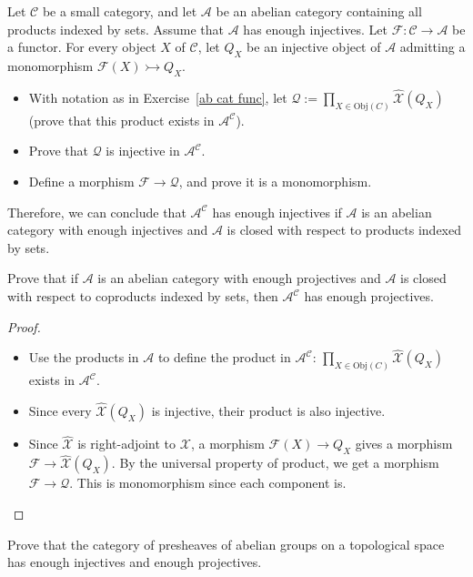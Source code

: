 \begin{exercise}
Let $\mathcal{C}$ be a small category, and let $\mathcal{A}$ be an abelian category containing all
products indexed by sets. Assume that $\mathcal{A}$ has enough injectives. Let $\mathscr{F}:\mathcal{C}\to\mathcal{A}$ be a functor. For every object $X$ of $\mathcal{C}$, let $Q_X$ be an injective object of $\mathcal{A}$ admitting a monomorphism $\mathscr{F}(X)\rightarrowtail Q_X$.
\begin{itemize}
\item With notation as in Exercise~\ref{ab cat func}, let $\mathscr{Q}:=\prod_{X\in\mathrm{Obj}(C)}\widehat{\mathscr{X}}(Q_X)$ (prove that this product exists in $\mathcal{A}^\mathcal{C}$).
\item Prove that $\mathscr{Q}$ is injective in $\mathcal{A}^\mathcal{C}$.
\item Define a morphism $\mathscr{F}\to\mathscr{Q}$, and prove it is a monomorphism.
\end{itemize}
Therefore, we can conclude that $\mathcal{A}^\mathcal{C}$ has enough injectives if $\mathcal{A}$ is an abelian category with enough injectives and $\mathcal{A}$ is closed with respect to products indexed by sets.\par
Prove that if $\mathcal{A}$ is an abelian category with enough projectives and $\mathcal{A}$ is closed
with respect to coproducts indexed by sets, then $\mathcal{A}^\mathcal{C}$ has enough projectives.
\end{exercise}
\begin{proof}
\mbox{}
\begin{itemize}
\item Use the products in $\mathcal{A}$ to define the product in $\mathcal{A}^\mathcal{C}$: $\prod_{X\in\mathrm{Obj}(C)}\widehat{\mathscr{X}}(Q_X)$ exists in $\mathcal{A}^\mathcal{C}$.
\item Since every $\widehat{\mathscr{X}}(Q_X)$ is injective, their product is also injective.
\item Since $\widehat{\mathscr{X}}$ is right-adjoint to $\mathscr{X}$, a morphism $\mathscr{F}(X)\to Q_X$ gives a morphism $\mathscr{F}\to\widehat{\mathscr{X}}(Q_X)$. By the universal property of product, we get a morphism $\mathscr{F}\to\mathscr{Q}$. This is monomorphism since each component is.
\end{itemize}
\end{proof}
\begin{exercise}
Prove that the category of presheaves of abelian groups on a topological space has enough injectives and enough projectives.
\end{exercise}
